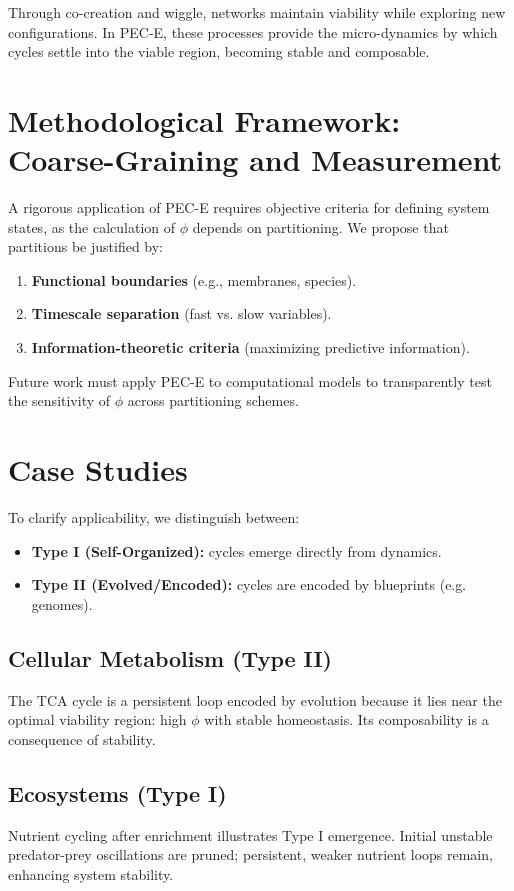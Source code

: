 \documentclass[12pt,a4paper]{article}
\begin{document}
Through co-creation and wiggle, networks maintain viability while exploring new configurations. In PEC-E, these processes provide the micro-dynamics by which cycles settle into the viable region, becoming stable and composable.

\section{Methodological Framework: Coarse-Graining and Measurement}
A rigorous application of PEC-E requires objective criteria for defining system states, as the calculation of $\phi$ depends on partitioning. We propose that partitions be justified by:
\begin{enumerate}
    \item \textbf{Functional boundaries} (e.g., membranes, species).
    \item \textbf{Timescale separation} (fast vs. slow variables).
    \item \textbf{Information-theoretic criteria} (maximizing predictive information).
\end{enumerate}

Future work must apply PEC-E to computational models to transparently test the sensitivity of $\phi$ across partitioning schemes.

\section{Case Studies}
To clarify applicability, we distinguish between:
\begin{itemize}
    \item \textbf{Type I (Self-Organized):} cycles emerge directly from dynamics.
    \item \textbf{Type II (Evolved/Encoded):} cycles are encoded by blueprints (e.g. genomes).
\end{itemize}

\subsection{Cellular Metabolism (Type II)}
The TCA cycle is a persistent loop encoded by evolution because it lies near the optimal viability region: high $\phi$ with stable homeostasis. Its composability is a consequence of stability.

\subsection{Ecosystems (Type I)}
Nutrient cycling after enrichment illustrates Type I emergence. Initial unstable predator-prey oscillations are pruned; persistent, weaker nutrient loops remain, enhancing system stability.
\end{document}
